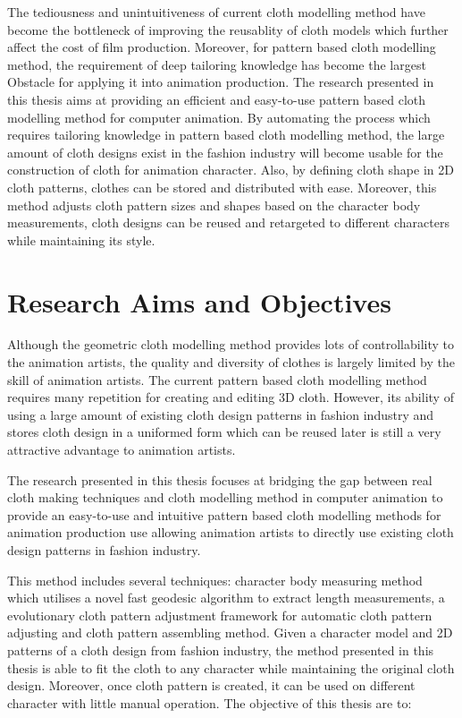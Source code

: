 The tediousness and unintuitiveness of current cloth modelling method have become the bottleneck of improving the reusablity of cloth models which further affect the cost of film production. Moreover, for pattern based cloth modelling method, the requirement of deep tailoring knowledge has become the largest Obstacle for applying it into animation production. The research presented in this thesis aims at providing an efficient and easy-to-use pattern based cloth modelling method for computer animation. By automating the process which requires tailoring knowledge in pattern based cloth modelling method, the large amount of cloth designs exist in the fashion industry will become usable for the construction of cloth for animation character. Also, by defining cloth shape in 2D cloth patterns, clothes can be stored and distributed with ease. Moreover, this method adjusts cloth pattern sizes and shapes based on the character body measurements, cloth designs can be reused and retargeted to different characters while maintaining its style. 


\section{Research Aims and Objectives}
Although the geometric cloth modelling method provides lots of controllability to the animation artists, the quality and diversity of clothes is largely limited by the skill of animation artists. The current pattern based cloth modelling method requires many repetition for creating and editing 3D cloth. However, its ability of using a large amount of existing cloth design patterns in fashion industry and stores cloth design in a uniformed form which can be reused later is still a very attractive advantage to animation artists. 

The research presented in this thesis focuses at bridging the gap between real cloth making techniques and cloth modelling method in computer animation to provide an easy-to-use and intuitive  pattern based cloth modelling methods for animation production use allowing animation artists to directly use existing cloth design patterns in fashion industry.

This method includes several techniques: character body measuring method which utilises a novel fast geodesic algorithm to extract length measurements, a evolutionary cloth pattern adjustment framework for automatic cloth pattern adjusting and cloth pattern assembling method. Given a character model and 2D patterns of a cloth design from fashion industry, the method presented in this thesis is able to fit the cloth to any character while maintaining the original cloth design. Moreover, once cloth pattern is created, it can be used on different character with little manual operation. The objective of this thesis are to:

